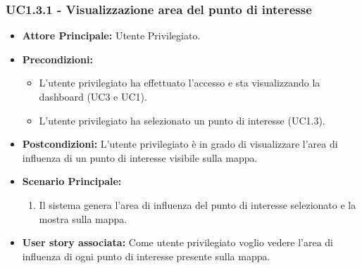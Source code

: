 \documentclass[11pt]{article}
\begin{document}
\begin{justify}
\subsubsection{\textbf{UC1.3.1 - Visualizzazione area del punto di interesse}}
\begin{itemize}
     \item \textbf{Attore Principale:} Utente Privilegiato.
     \item \textbf{Precondizioni:}
        \begin{itemize}
            \item L'utente privilegiato ha effettuato l'accesso e sta visualizzando la dashboard (UC3 e UC1).
            \item L'utente privilegiato ha selezionato un punto di interesse (UC1.3).
        \end{itemize}
     \item \textbf{Postcondizioni:} L'utente privilegiato è in grado di visualizzare l'area di influenza di un punto di interesse visibile sulla mappa.
     \item \textbf{Scenario Principale:}
        \begin{enumerate}
            \item Il sistema genera l'area di influenza del punto di interesse selezionato e la mostra sulla mappa.
        \end{enumerate}
     \item \textbf{User story associata:}
     Come utente privilegiato voglio vedere l'area di influenza di ogni punto di interesse presente sulla mappa.
\end{itemize}

\end{justify}
\end{document}
